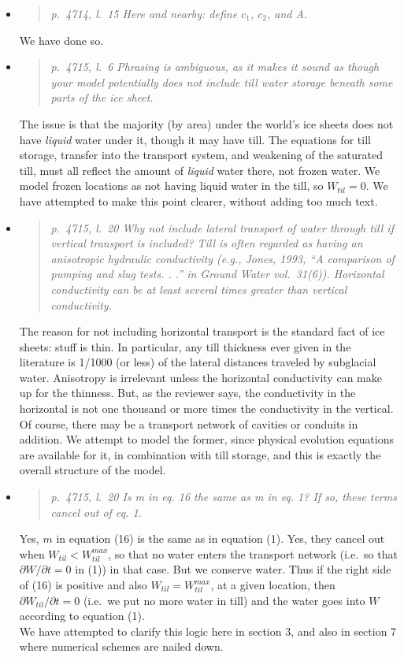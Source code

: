 \documentclass[11pt,reqno]{amsart}
\newcommand{\reply}[2]{
\medskip\medskip
\item  \begin{quote}
\emph{#1}
\end{quote}

\medskip
\noindent #2}
\begin{document}
\begin{itemize}
\reply{p.~4714, l.~15 Here and nearby: define $c_1$, $c_2$, and A.}
{We have done so.}

\reply{p.~4715, l.~6 Phrasing is ambiguous, as it makes it sound as though your model
potentially does not include till water storage beneath some parts of the ice sheet.}
{The issue is that the majority (by area) under the world's ice sheets does not have \emph{liquid} water under it, though it may have till.  The equations for till storage, transfer into the transport system, and weakening of the saturated till, must all reflect the amount of \emph{liquid} water there, not frozen water.  We model frozen locations as not having liquid water in the till, so $W_{til}=0$.  We have attempted to make this point clearer, without adding too much text.}

\reply{p.~4715, l.~20 Why not include lateral transport of water through till if vertical transport is included?  Till is often regarded as having an anisotropic hydraulic conductivity (e.g., Jones, 1993, ``A comparison of pumping and slug tests. . .'' in Ground Water vol.~31(6)).  Horizontal conductivity can be at least several times greater than vertical conductivity.}
{The reason for not including horizontal transport is the standard fact of ice sheets: stuff is thin.  In particular, any till thickness ever given in the literature is 1/1000 (or less) of the lateral distances traveled by subglacial water.  Anisotropy is irrelevant unless the horizontal conductivity can make up for the thinness.  But, as the reviewer says, the conductivity in the horizontal is not one thousand or more times the conductivity in the vertical.  Of course, there may be a transport network of cavities or conduits in addition.  We attempt to model the former, since physical evolution equations are available for it, in combination with till storage, and this is exactly the overall structure of the model.}

\reply{p.~4715, l.~20 Is m in eq. 16 the same as m in eq. 1?  If so, these terms cancel out of
eq. 1.}
{Yes, $m$ in equation (16) is the same as in equation (1).  Yes, they cancel out when $W_{til}< W_{til}^{max}$, so that no water enters the transport network (i.e.~so that $\partial W/\partial t=0$ in (1)) in that case.  But we conserve water.  Thus if the right side of (16) is positive and also $W_{til} = W_{til}^{max}$, at a given location, then $\partial W_{til}/\partial t=0$ (i.e.~we put no more water in till) and the water goes into $W$ according to equation (1). \\
\indent We have attempted to clarify this logic here in section 3, and also in section 7 where numerical schemes are nailed down.}


\end{itemize}
\end{document}
